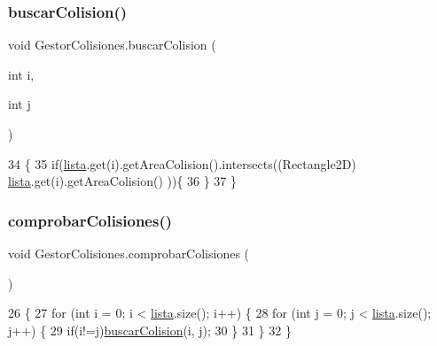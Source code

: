 \subsubsection{\texorpdfstring{buscar\+Colision()}{buscarColision()}}
{\footnotesize\ttfamily void Gestor\+Colisiones.\+buscar\+Colision (\begin{DoxyParamCaption}\item[{int}]{i,  }\item[{int}]{j }\end{DoxyParamCaption})\hspace{0.3cm}{\ttfamily [inline]}}


\begin{DoxyCode}
34                                             \{
35         \textcolor{keywordflow}{if}(\mbox{\hyperlink{class_gestor_colisiones_a549c1c33a353c2929b060fb9474e90ea}{lista}}.get(i).getAreaColision().intersects((Rectangle2D) \mbox{\hyperlink{class_gestor_colisiones_a549c1c33a353c2929b060fb9474e90ea}{lista}}.get(i).getAreaColision()
      ))\{
36     \}
37 \}
\end{DoxyCode}
\mbox{\label{class_gestor_colisiones_a9ac496985991a5271cf639db982e85f4}} 
\subsubsection{\texorpdfstring{comprobar\+Colisiones()}{comprobarColisiones()}}
{\footnotesize\ttfamily void Gestor\+Colisiones.\+comprobar\+Colisiones (\begin{DoxyParamCaption}{ }\end{DoxyParamCaption})\hspace{0.3cm}{\ttfamily [inline]}}


\begin{DoxyCode}
26                                      \{
27         \textcolor{keywordflow}{for} (\textcolor{keywordtype}{int} i = 0; i < \mbox{\hyperlink{class_gestor_colisiones_a549c1c33a353c2929b060fb9474e90ea}{lista}}.size(); i++) \{
28             \textcolor{keywordflow}{for} (\textcolor{keywordtype}{int} j = 0; j < \mbox{\hyperlink{class_gestor_colisiones_a549c1c33a353c2929b060fb9474e90ea}{lista}}.size(); j++) \{
29                 \textcolor{keywordflow}{if}(i!=j)\mbox{\hyperlink{class_gestor_colisiones_a74fa3551ed7f8a2f8d045b8978953835}{buscarColision}}(i, j);
30             \}
31         \}
32     \}
\end{DoxyCode}
\mbox{\label{class_gestor_colisiones_aa507081e558aa27c6e9d7be44e2e620e}} 
